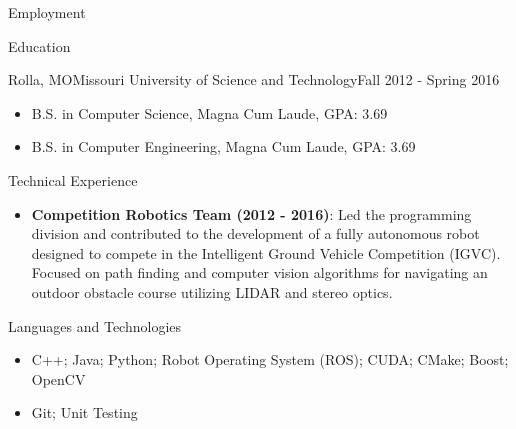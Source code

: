 \documentclass[]{mcdowellcv}
\begin{document}
\begin{cvsection}{Employment}
\end{cvsection}

\begin{cvsection}{Education}
    \begin{cvsubsection}[2]{Rolla, MO}{Missouri University of Science and Technology}{Fall 2012 - Spring 2016}
        \begin{itemize}
            \item B.S. in Computer Science, Magna Cum Laude, GPA: 3.69
            \item B.S. in Computer Engineering, Magna Cum Laude, GPA: 3.69
        \end{itemize}
    \end{cvsubsection}
\end{cvsection} 

\begin{cvsection}{Technical Experience}
    \begin{cvsubsection}{}{}{}  
        \begin{itemize} 
            \item \textbf{Competition Robotics Team (2012 - 2016)}: Led the programming division and contributed to the development of a fully autonomous robot designed to compete in the Intelligent Ground Vehicle Competition (IGVC). Focused on path finding and computer vision algorithms for navigating an outdoor obstacle course utilizing LIDAR and stereo optics.
        \end{itemize}
    \end{cvsubsection}
\end{cvsection}

\begin{cvsection}{Languages and Technologies}
    \begin{cvsubsection}{}{}{}  
        \begin{itemize}
            \item C++; Java; Python; Robot Operating System (ROS); CUDA; CMake; Boost; OpenCV 
            \item Git; Unit Testing
        \end{itemize}
    \end{cvsubsection}
\end{cvsection}
\end{document}
